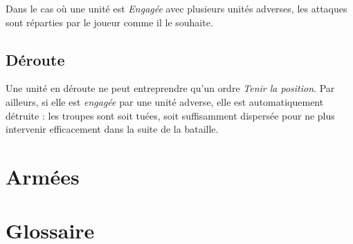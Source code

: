 \documentclass[10pt,a4paper]{book}
\begin{document}
Dans le cas où une unité est \emph{Engagée} avec plusieurs unités adverses, les attaques sont réparties par le joueur comme il le souhaite.
\section{Déroute}
Une unité en déroute ne peut entreprendre qu'un ordre \emph{Tenir la position}. Par ailleurs, si elle est \emph{engagée} par une unité adverse, elle est automatiquement détruite : les troupes sont soit tuées, soit suffisamment dispersée pour ne plus intervenir efficacement dans la suite de la bataille.
\chapter{Armées}

\chapter{Glossaire}
\begin{description}

\end{description}
\end{document}
